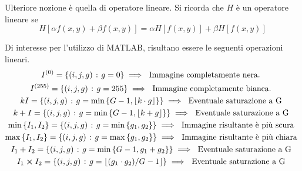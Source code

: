 \documentclass{subfiles}
\begin{document}
\noindent Ulteriore nozione è quella di operatore lineare. Si ricorda che \(H\) è un operatore lineare se
\[
    H[\alpha f(x,y) + \beta f(x,y)] = \alpha H[f(x,y)] + \beta H[f(x, y)]
\]

\noindent Di interesse per l'utilizzo di MATLAB, risultano essere le seguenti operazioni lineari.
\[\begin{gathered}
        I^{(0)} = \set{(i,j,g)}{g = 0} \implies \text{Immagine completamente nera.} \\
        I^{(255)} = \set{(i,j,g)}{g = 255} \implies \text{Immagine completamente bianca.} \\
        kI = \set{(i,j,g)}{g = \min{G - 1, \floor{k \cdot g}}} \implies \text{Eventuale saturazione a G} \\
        k + I = \set{(i,j,g)}{g = \min{G - 1, \floor{k + g}}} \implies \text{Eventuale saturazione a G} \\
        \min{I_{1}, I_{2}} = \set{(i,j,g)}{g = \min{g_{1}, g_{2}}} \implies \text{Immagine risultante è più scura} \\
        \max{I_{1}, I_{2}} = \set{(i,j,g)}{g = \max{g_{1}, g_{2}}} \implies \text{Immagine risultante è più chiara} \\
        I_{1} + I_{2} = \set{(i,j,g)}{g = \min{G - 1, g_{1} + g_{2}}} \implies \text{Eventuale saturazione a G} \\
        I_{1} \cp I_{2} = \set{(i,j,g)}{g = \floor{(g_{1} \cdot g_{2})/G - 1}} \implies \text{Eventuale saturazione a G} \\
    \end{gathered}\]
\clearpage
\end{document}
